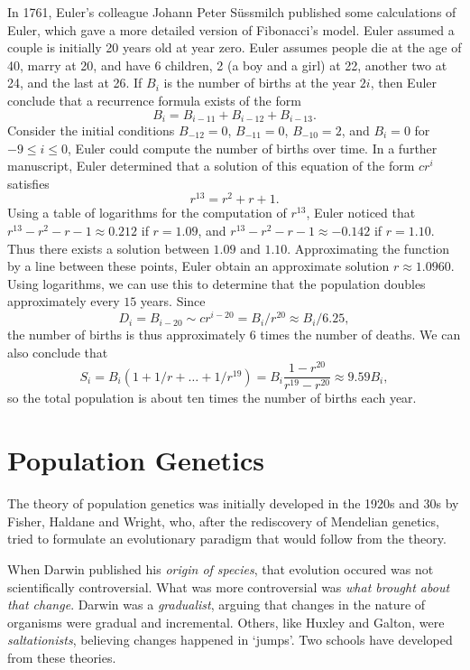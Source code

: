 In 1761, Euler's colleague Johann Peter S\"{u}ssmilch published some calculations of Euler, which gave a more detailed version of Fibonacci's model. Euler assumed a couple is initially 20 years old at year zero. Euler assumes people die at the age of 40, marry at 20, and have 6 children, 2 (a boy and a girl) at 22, another two at 24, and the last at 26. If $B_i$ is the number of births at the year $2i$, then Euler conclude that a recurrence formula exists of the form
%
\[ B_i = B_{i - 11} + B_{i - 12} + B_{i - 13}. \]
%
Consider the initial conditions $B_{-12} = 0$, $B_{-11} = 0$, $B_{-10} = 2$, and $B_i = 0$ for $-9 \leq i \leq 0$, Euler could compute the number of births over time. In a further manuscript, Euler determined that a solution of this equation of the form $c r^i$ satisfies
%
\[ r^{13} = r^2 + r + 1. \]
%
Using a table of logarithms for the computation of $r^{13}$, Euler noticed that $r^{13} - r^2 - r - 1 \approx 0.212$ if $r = 1.09$, and $r^{13} - r^2 - r - 1 \approx -0.142$ if $r = 1.10$. Thus there exists a solution between $1.09$ and $1.10$. Approximating the function by a line between these points, Euler obtain an approximate solution $r \approx 1.0960$. Using logarithms, we can use this to determine that the population doubles approximately every $15$ years. Since
%
\[ D_i = B_{i - 20} \sim c r^{i-20} = B_i / r^{20} \approx B_i / 6.25, \]
%
the number of births is thus approximately 6 times the number of deaths. We can also conclude that
%
\[ S_i = B_i ( 1 + 1/r + \dots + 1/r^{19} ) = B_i \frac{1 - r^{20}}{r^{19} - r^{20}} \approx 9.59 B_i, \]
%
so the total population is about ten times the number of births each year.

\chapter{Population Genetics}

The theory of population genetics was initially developed in the 1920s and 30s by Fisher, Haldane and Wright, who, after the rediscovery of Mendelian genetics, tried to formulate an evolutionary paradigm that would follow from the theory.

When Darwin published his \emph{origin of species}, that evolution occured was not scientifically controversial. What was more controversial was \emph{what brought about that change}. Darwin was a \emph{gradualist}, arguing that changes in the nature of organisms were gradual and incremental. Others, like Huxley and Galton, were \emph{saltationists}, believing changes happened in `jumps'. Two schools have developed from these theories.

